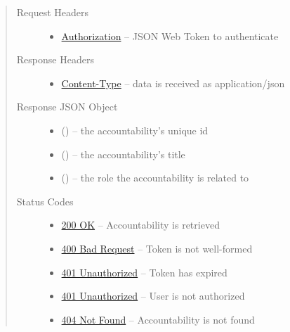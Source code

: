 \documentclass[letterpaper,10pt,english]{sphinxmanual}
\begin{document}
\begin{fulllineitems}
\begin{quote}
\begin{description}
\begin{itemize}
\end{itemize}

\item[{Request Headers}] \leavevmode\begin{itemize}
\item {} 
\href{http://tools.ietf.org/html/rfc7235\#section-4.2}{Authorization} -- JSON Web Token to authenticate

\end{itemize}

\item[{Response Headers}] \leavevmode\begin{itemize}
\item {} 
\href{http://tools.ietf.org/html/rfc7231\#section-3.1.1.5}{Content-Type} -- data is received as application/json

\end{itemize}

\item[{Response JSON Object}] \leavevmode\begin{itemize}
\item {} 
 () -- the accountability's unique id

\item {} 
 () -- the accountability's title

\item {} 
 () -- the role the accountability is related to

\end{itemize}

\item[{Status Codes}] \leavevmode\begin{itemize}
\item {} 
\href{http://www.w3.org/Protocols/rfc2616/rfc2616-sec10.html\#sec10.2.1}{200 OK} -- Accountability is retrieved

\item {} 
\href{http://www.w3.org/Protocols/rfc2616/rfc2616-sec10.html\#sec10.4.1}{400 Bad Request} -- Token is not well-formed

\item {} 
\href{http://www.w3.org/Protocols/rfc2616/rfc2616-sec10.html\#sec10.4.2}{401 Unauthorized} -- Token has expired

\item {} 
\href{http://www.w3.org/Protocols/rfc2616/rfc2616-sec10.html\#sec10.4.2}{401 Unauthorized} -- User is not authorized

\item {} 
\href{http://www.w3.org/Protocols/rfc2616/rfc2616-sec10.html\#sec10.4.5}{404 Not Found} -- Accountability is not found

\end{itemize}

\end{description}\end{quote}

\end{fulllineitems}
\end{document}
